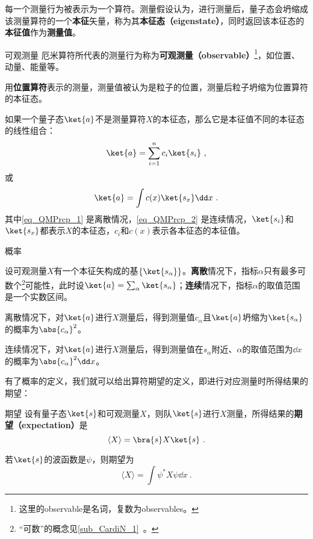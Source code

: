 每一个测量行为被表示为一个算符。测量假设认为，进行测量后，量子态会坍缩成该测量算符的一个\textbf{本征}矢量，称为其\textbf{本征态（eigenstate）}，同时返回该本征态的\textbf{本征值}作为\textbf{测量值}。

\begin{definition}{可观测量}\label{def_QMPrcp_14}
厄米算符所代表的测量行为称为\textbf{可观测量（observable）}\footnote{这里的observable是名词，复数为observables。}，如位置、动量、能量等。
\end{definition}

\begin{example}{}
用\textbf{位置算符}表示的测量，测量值被认为是粒子的位置，测量后粒子坍缩为位置算符的本征态。
\end{example}

如果一个量子态$\ket{a}$不是测量算符$X$的本征态，那么它是本征值不同的本征态的线性组合：
\begin{equation}\label{eq_QMPrcp_1}
\ket{a} = \sum_{i=1}^{n} c_i\ket{s_i}~,
\end{equation}
或
\begin{equation}\label{eq_QMPrcp_2}
\ket{a} = \int c(x)\ket{s_x}\dd x~.
\end{equation}
其中\autoref{eq_QMPrcp_1} 是离散情况，\autoref{eq_QMPrcp_2} 是连续情况，$\ket{s_i}$和$\ket{s_x}$都表示$X$的本征态，$c_i$和$c(x)$表示各本征态的本征值。

\begin{definition}{概率}\label{def_QMPrcp_15}

设可观测量$X$有一个本征矢构成的基$\{\ket{s_\alpha}\}$。\textbf{离散}情况下，指标$\alpha$只有最多可数个\footnote{“可数”的概念见\autoref{sub_CardiN_1}~。}可能性，此时设$\ket{a}=\sum_{\alpha}\ket{s_\alpha}$；\textbf{连续}情况下，指标$\alpha$的取值范围是一个实数区间。

离散情况下，对$\ket{a}$进行$X$测量后，得到测量值$c_\alpha$且$\ket{a}$坍缩为$\ket{s_\alpha}$的概率为$\abs{c_\alpha}^2$。

连续情况下，对$\ket{a}$进行$X$测量后，得到测量值在$s_{\alpha}$附近、$\alpha$的取值范围为$\dd x$的概率为$\abs{c_\alpha}^2\dd x$。
\end{definition}

有了概率的定义，我们就可以给出算符期望的定义，即进行对应测量时所得结果的期望：
\begin{definition}{期望}\label{def_QMPrcp_18}
设有量子态$\ket{s}$和可观测量$X$，则队$\ket{s}$进行$X$测量，所得结果的\textbf{期望（expectation）}是
\begin{equation}
\langle X \rangle = \bra{s}X\ket{s}~.
\end{equation}

若$\ket{s}$的波函数是$\psi$，则期望为
\begin{equation}
\langle X \rangle  = \int \psi^* X \psi \dd x~.
\end{equation}

\end{definition}


